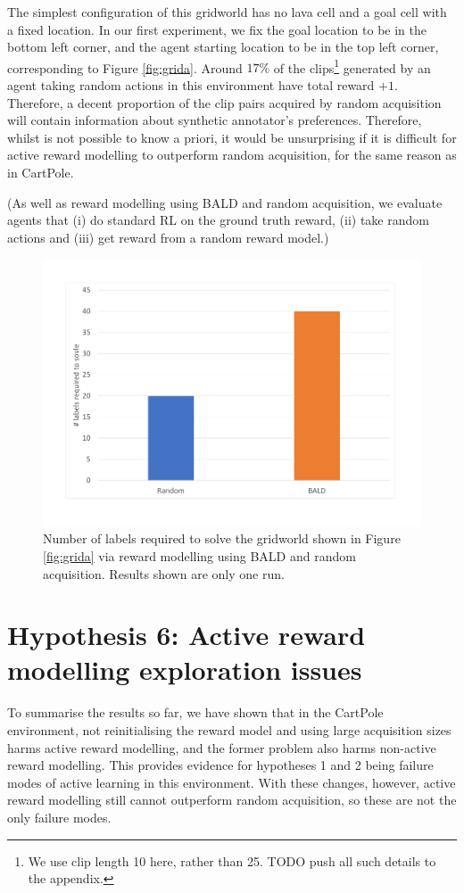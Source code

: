\documentclass[11pt, a4paper, bibliography=totoc]{report}
\begin{document}
The simplest configuration of this gridworld has no lava cell and a goal cell with a fixed location. In our first experiment, we fix the goal location to be in the bottom left corner, and the agent starting location to be in the top left corner, corresponding to Figure \ref{fig:grida}. Around $ 17\% $ of the clips\footnote{We use clip length 10 here, rather than 25. TODO push all such details to the appendix.} generated by an agent taking random actions in this environment have total reward $ +1 $. Therefore, a decent proportion of the clip pairs acquired by random acquisition will contain information about synthetic annotator's preferences. Therefore, whilst is not possible to know a priori, it would be unsurprising if it is difficult for active reward modelling to outperform random acquisition, for the same reason as in CartPole.

(As well as reward modelling using BALD and random acquisition, we evaluate agents that (i) do standard RL on the ground truth reward, (ii) take random actions and (iii) get reward from a random reward model.)

\begin{figure}[h]
	\centering
	\includegraphics[width=\textwidth]{grid_simple}
	\caption{Number of labels required to solve the gridworld shown in Figure \ref{fig:grida} via reward modelling using BALD and random acquisition. Results shown are only one run.}
	\label{fig:grid_simple}
\end{figure}


\section{Hypothesis 6: Active reward modelling exploration issues}
To summarise the results so far, we have shown that in the CartPole environment, not reinitialising the reward model and using large acquisition sizes harms active reward modelling, and the former problem also harms non-active reward modelling. This provides evidence for hypotheses 1 and 2 being failure modes of active learning in this environment. With these changes, however, active reward modelling still cannot outperform random acquisition, so these are not the only failure modes.
\end{document}
